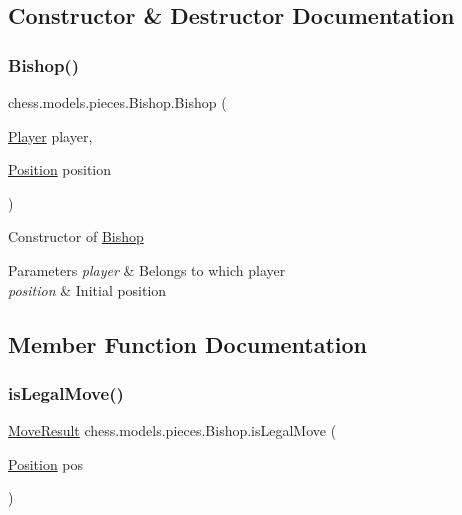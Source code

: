 \subsection{Constructor \& Destructor Documentation}
\mbox{\label{classchess_1_1models_1_1pieces_1_1_bishop_a9abc7cf53fde3e6ec5f8af6fbc7b005d}} 
\subsubsection{\texorpdfstring{Bishop()}{Bishop()}}
{\footnotesize\ttfamily chess.\+models.\+pieces.\+Bishop.\+Bishop (\begin{DoxyParamCaption}\item[{\mbox{\hyperlink{enumchess_1_1models_1_1enums_1_1_player}{Player}}}]{player,  }\item[{\mbox{\hyperlink{classchess_1_1models_1_1_position}{Position}}}]{position }\end{DoxyParamCaption})}

Constructor of \mbox{\hyperlink{classchess_1_1models_1_1pieces_1_1_bishop}{Bishop}}


\begin{DoxyParams}{Parameters}
{\em player} & Belongs to which player \\
\hline
{\em position} & Initial position \\
\hline
\end{DoxyParams}


\subsection{Member Function Documentation}
\mbox{\label{classchess_1_1models_1_1pieces_1_1_bishop_ae5a545cda22d44b4c4cbfeebab5c0853}} 
\subsubsection{\texorpdfstring{is\+Legal\+Move()}{isLegalMove()}}
{\footnotesize\ttfamily \mbox{\hyperlink{enumchess_1_1models_1_1enums_1_1_move_result}{Move\+Result}} chess.\+models.\+pieces.\+Bishop.\+is\+Legal\+Move (\begin{DoxyParamCaption}\item[{\mbox{\hyperlink{classchess_1_1models_1_1_position}{Position}}}]{pos }\end{DoxyParamCaption})}

